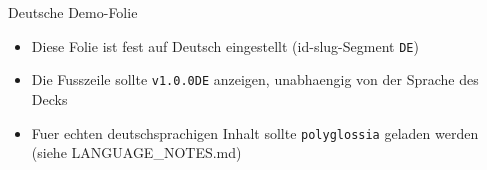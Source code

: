
\begin{standardframe}{Deutsche Demo-Folie}
	\begin{itemize}
		\item Diese Folie ist fest auf Deutsch eingestellt (id-slug-Segment \texttt{DE})
		\item Die Fusszeile sollte \texttt{v1.0.0DE} anzeigen, unabhaengig von der Sprache des Decks
		\item Fuer echten deutschsprachigen Inhalt sollte \texttt{polyglossia} geladen werden (siehe LANGUAGE\_NOTES.md)
	\end{itemize}
\end{standardframe}
